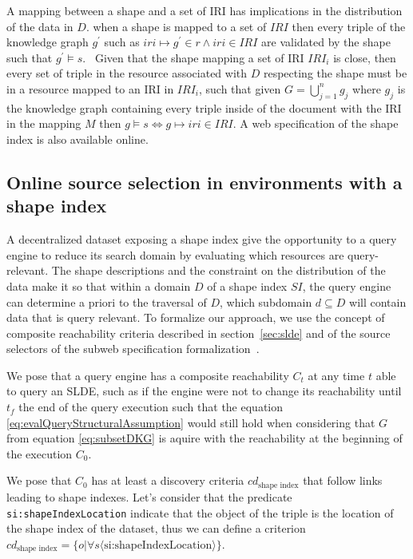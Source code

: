 A mapping between a shape and a set of IRI has implications in the distribution of the data in $D$.
when a shape is mapped to a set of $IRI$ then every triple of the knowledge graph $g^{\prime}$ such as $iri \mapsto g^{\prime} \in r \land iri \in IRI$
are validated by the shape such that $g^{\prime} \models s$.~
Given that the shape mapping a set of IRI $IRI_i$ is close, then every set of triple in the resource associated with $D$ respecting the shape must be in a resource mapped to an IRI in $IRI_i$, 
such that given $G = \bigcup\limits_{j=1}^{n} g_j$ where $g_j$ is the knowledge graph containing every triple inside of the document with the IRI in the mapping $M$
then $g \models s \iff g \mapsto iri \in IRI$.
A web specification of the shape index is also available online.~

\subsection{Online source selection in environments with a shape index}

A decentralized dataset exposing a shape index give the opportunity to a query engine to reduce its search domain by evaluating which resources are query-relevant.
The shape descriptions and the constraint on the distribution of the data make it so that within a domain $D$ of a shape index $SI$, the query engine can
determine a priori to the traversal of $D$, which subdomain $d \subseteq D$ will contain data that is query relevant.
To formalize our approach, we use the concept of composite reachability criteria described in section~\ref{sec:slde} and of the source selectors of the subweb specification formalization~\cite{Bogaerts2021LinkTW, Taelman2023}.

We pose that a query engine has a composite reachability $C_t$ at any time $t$ able to query an SLDE, such as if the engine were not to change its reachability
until $t_f$ the end of the query execution such that the equation \ref{eq:evalQueryStructuralAssumption} would still hold when considering that $G$ from equation \ref{eq:subsetDKG} is aquire with the reachability 
at the beginning of the execution $C_{0}$.


We pose that $C_0$ has at least a discovery criteria $cd_{\text{shape index}}$ that follow links leading to shape indexes.
Let's consider that the predicate \texttt{si:shapeIndexLocation} indicate that the object of the triple is the location of the shape index 
of the dataset, thus we can define a criterion $cd_{\text{shape index}} = \{o|\forall s \langle \text{si:shapeIndexLocation} \rangle \}$.

